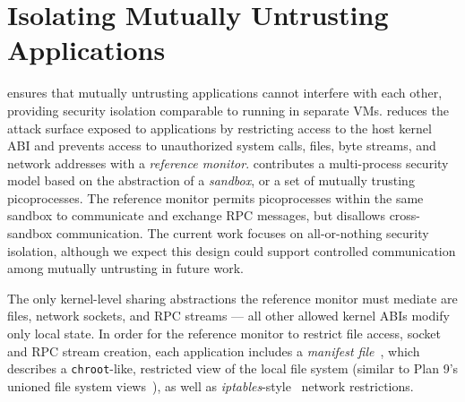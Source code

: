 \section{Isolating Mutually Untrusting Applications}
\label{sec:graphene:security}

\graphene{} ensures that mutually untrusting applications 
cannot interfere with each other, providing security isolation
comparable to running in separate VMs.
\graphene{} reduces the attack surface exposed to applications
by restricting access to the host kernel ABI 
and prevents access to unauthorized system calls, files, byte streams,
and network addresses with a \emph{reference monitor}.
\graphene{} contributes a multi-process security model 
based on the abstraction of a \emph{sandbox},
or a set of mutually trusting picoprocesses.
The reference monitor permits picoprocesses within the same sandbox
to communicate and exchange RPC messages, but disallows cross-sandbox communication.
The current work focuses on all-or-nothing security isolation, although we expect
this design could support
controlled communication among mutually untrusting \liboses{}
in future work.

The only kernel-level sharing abstractions the reference monitor must mediate
are files, network sockets, and RPC streams
--- all other allowed kernel ABIs
modify only local \picoproc{} state.
In order for the reference monitor to restrict file access, socket and RPC stream creation,
each application includes a \emph{manifest file}~\cite{hunt07rethink},
which describes a {\tt chroot}-like, restricted view of the local 
file system (similar to Plan 9's unioned file system views~\cite{pike90plan9}),
as well as \emph{iptables}-style~\cite{iptablesman} network restrictions.


